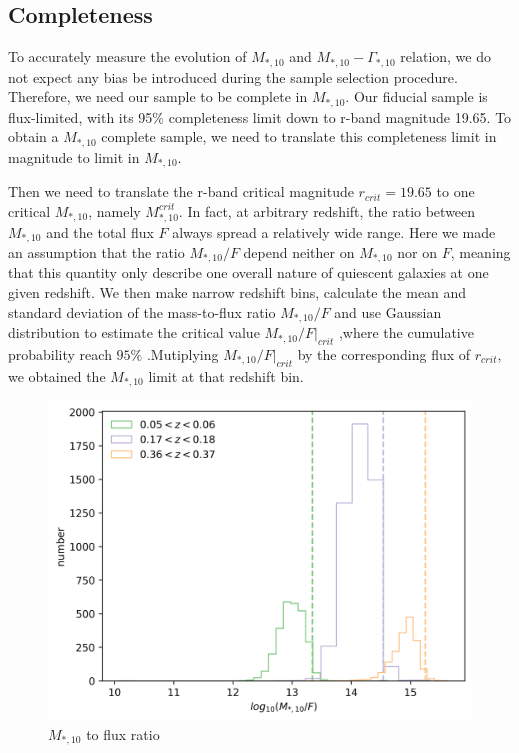 \documentclass[fleqn,usenatbib]{mnras}
\begin{document}
\subsection{Completeness}
To accurately measure the evolution of $M_{*,10}$ and $M_{*,10} - \Gamma_{*,10} $ relation, we do not expect any bias be introduced during the sample selection procedure. Therefore, we need our sample to be complete in $M_{*,10}$. Our fiducial sample is flux-limited, with its 95\% completeness limit down to r-band magnitude 19.65. To obtain a $M_{*,10}$ complete sample, we need to translate this completeness limit in magnitude to limit in $M_{*,10}$.
\par Then we need to translate the r-band critical magnitude $r_{crit} = 19.65$ to one critical $M_{*,10}$, namely $M_{*,10}^{crit}$. In fact, at arbitrary redshift, the ratio between $M_{*,10}$ and the total flux $F$ always spread a relatively wide range. Here we made an assumption that the ratio $M_{*,10} / F$ depend neither on $M_{*,10} $ nor on $F$, meaning that this quantity only describe one overall nature of quiescent galaxies at one given redshift. We then make narrow redshift bins, calculate the mean and standard deviation of the mass-to-flux ratio $M_{*,10} / F$ and use Gaussian distribution to estimate the critical value $M_{*,10} / F|_{crit}$ ,where the cumulative probability reach $95\%$ .Mutiplying $M_{*,10} / F|_{crit}$ by the corresponding flux of $r_{crit}$, we obtained the $M_{*,10}$ limit at that redshift bin. 
\begin{figure}
    \centering
    \includegraphics[width=\linewidth]{figure/m2f_ratio.png}
    \caption{$M_{*,10} $ to flux ratio}
    \label{fig:m2f}
\end{figure}
\end{document}
